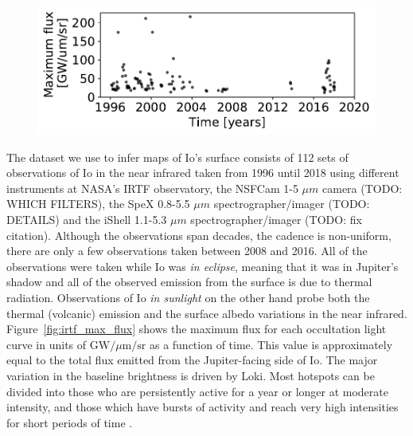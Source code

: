 \documentclass[modern]{aastex62}
\begin{document}
\begin{figure}[h!]
    \begin{centering}
    \includegraphics[width=\linewidth]{figures/irtf_max_flux.pdf}
    \end{centering}
\end{figure}

The dataset we use to infer maps of Io's surface consists of 112 sets of observations of Io in the near infrared taken from 1996 until 2018 using different instruments at NASA's IRTF observatory, the NSFCam  1-5 $\mu m$ camera \citep{shure1994} (TODO: WHICH FILTERS), the SpeX 0.8-5.5 $\mu m$ spectrographer/imager \citep{rayner2003} (TODO: DETAILS) and the iShell 1.1-5.3 $\mu m$  spectrographer/imager \citep{johnrayner2016} (TODO: fix citation).
Although the observations span decades, the cadence is non-uniform, there are only a few observations taken between 2008 and 2016.
All of the observations were taken while Io was \emph{in eclipse}, meaning that it was in Jupiter's shadow and all of the observed emission from the surface is due to thermal radiation.
Observations of Io \emph{in sunlight} on the other hand probe both the thermal (volcanic) emission and the surface albedo variations in the near infrared.
Figure~\ref{fig:irtf_max_flux} shows the maximum flux for each occultation light curve in units of $\mathrm{GW}/\mu \mathrm{m}/\mathrm{sr}$ as a function of time.
This value is approximately equal to the total flux emitted from the Jupiter-facing side of Io.
The major variation in the baseline brightness is driven by Loki.
Most hotspots can be divided into those who are persistently active for a year or longer at moderate intensity, and those which have bursts of activity and reach very high intensities for short periods of time \cite{dekleer2016}.
\end{document}
